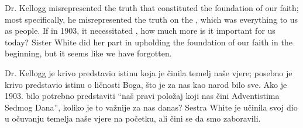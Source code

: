 Dr. Kellogg misrepresented the truth that constituted the foundation of our faith; most specifically, he misrepresented the truth on the , which was everything to us as people. If in 1903, it necessitated , how much more is it important for us today? Sister White did her part in upholding the foundation of our faith in the beginning, but it seems like we have forgotten.


Dr. Kellogg je krivo predstavio istinu koja je činila temelj naše vjere; posebno je krivo predstavio istinu o ličnosti Boga, što je za nas kao narod bilo sve. Ako je 1903. bilo potrebno predstaviti “naš pravi položaj koji nas čini Adventistima Sedmog Dana”, koliko je to važnije za nas danas? Sestra White je učinila svoj dio u očuvanju temelja naše vjere na početku, ali čini se da smo zaboravili.
